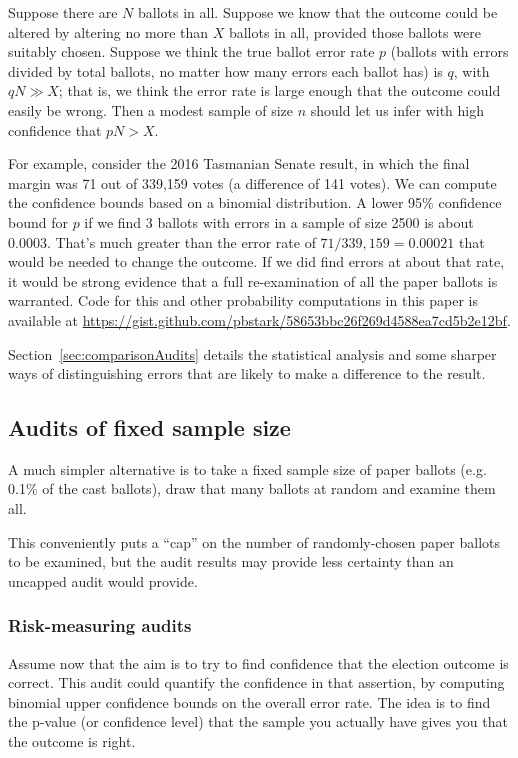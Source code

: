 \documentclass[10pt,a4paper]{article}
\newcommand{\VTNote}[1]{}
\newcommand{\longVersion}[1]{#1}
\newcommand{\longVersion}[1]{}
\begin{document}
Suppose there are $N$ ballots in all.
Suppose we know that the outcome could be altered by altering no more than $X$ ballots in all, provided those ballots were suitably chosen.  Suppose
we think the true ballot error rate $p$ (ballots with errors divided by total ballots, no matter how many errors each ballot has) is $q$, with $qN \gg X$; that is, we think the error rate is large enough that the outcome could easily be wrong.  Then a modest sample
of size $n$ should let us infer with high confidence that $pN > X$. 

For example, consider the 2016 Tasmanian Senate result, in which the final margin was 71 out of 339,159 votes (a difference of 141 votes).  We can compute the confidence bounds based on a binomial distribution.  A lower 95\% confidence bound for $p$ if we find 3 ballots with errors in a sample of size 2500 is about 0.0003.  That's much greater than the error rate of 
$71/339,159 = 0.00021$ that would be needed to change the outcome.
If we did find errors at about that rate, it would be strong evidence that a full re-examination of all the paper ballots is warranted.  Code for this and other probability computations in this paper is available at \url{https://gist.github.com/pbstark/58653bbc26f269d4588ea7cd5b2e12bf}.

\longVersion{Section~\ref{sec:comparisonAudits} details the statistical analysis and some sharper ways of distinguishing errors that are likely to make a difference to the result.  \VTNote{Actually I'm not sure it does.  Not sure there are any useful sharper distinctions.  Are the stats just binomial bounds again?}}

\subsection{Audits of fixed sample size} \label{subsec:fixedSize}
A much simpler alternative is to
take a fixed sample size of paper ballots (e.g. 0.1\% of the cast ballots), draw that
many ballots at random and examine them all.

This conveniently puts a ``cap'' on the number of randomly-chosen 
paper ballots to be examined, but 
the audit results may provide less certainty than an uncapped
audit would provide.

\subsubsection{Risk-measuring audits}

Assume now that the aim is to try to find confidence that the election outcome is correct.  This audit could quantify the confidence in that assertion, by computing binomial upper confidence bounds on the overall error rate.    The idea is to find the p-value (or confidence level) that the sample you actually have gives you that the outcome is right.
\end{document}
